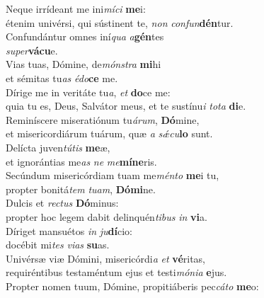 \evenverse Neque irrídeant me ini\textit{mí}\textit{ci} \textbf{me}i:~\*\\
\evenverse étenim univérsi, qui sústinent te, \textit{non} \textit{con}\textit{fun}\textbf{dén}tur.\\
\oddverse Confundántur omnes iní\textit{qua} \textit{a}\textbf{gén}tes~\*\\
\oddverse \textit{su}\textit{per}\textbf{vá}\textbf{cu}e.\\
\evenverse Vias tuas, Dómine, de\textit{món}\textit{stra} \textbf{mi}hi~\*\\
\evenverse et sémitas tu\textit{as} \textit{é}\textit{do}\textbf{ce} me.\\
\oddverse Dírige me in veritáte tu\textit{a}, \textit{et} \textbf{do}ce me:~\*\\
\oddverse quia tu es, Deus, Salvátor meus, et te sustínu\textit{i} \textit{to}\textit{ta} \textbf{di}e.\\
\evenverse Reminíscere miseratiónum tu\textit{á}\textit{rum}, \textbf{Dó}mine,~\*\\
\evenverse et misericordiárum tuárum, quæ \textit{a} \textit{sǽ}\textit{cu}\textbf{lo} sunt.\\
\oddverse Delícta juven\textit{tú}\textit{tis} \textbf{me}æ,~\*\\
\oddverse et ignorántias me\textit{as} \textit{ne} \textit{me}\textbf{mí}\textbf{ne}ris.\\
\evenverse Secúndum misericórdiam tuam me\textit{mén}\textit{to} \textbf{me}i tu,~\*\\
\evenverse propter bonitá\textit{tem} \textit{tu}\textit{am}, \textbf{Dó}\textbf{mi}ne.\\
\oddverse Dulcis et \textit{re}\textit{ctus} \textbf{Dó}minus:~\*\\
\oddverse propter hoc legem dabit delinquén\textit{ti}\textit{bus} \textit{in} \textbf{vi}a.\\
\evenverse Díriget mansuétos \textit{in} \textit{ju}\textbf{dí}cio:~\*\\
\evenverse docébit mi\textit{tes} \textit{vi}\textit{as} \textbf{su}as.\\
\oddverse Univérsæ viæ Dómini, misericórdi\textit{a} \textit{et} \textbf{vé}ritas,~\*\\
\oddverse requiréntibus testaméntum ejus et testi\textit{mó}\textit{ni}\textit{a} \textbf{e}jus.\\
\evenverse Propter nomen tuum, Dómine, propitiáberis pec\textit{cá}\textit{to} \textbf{me}o:~\*\\
